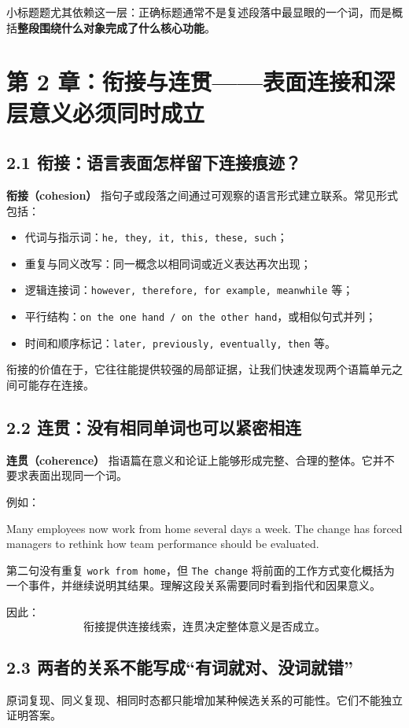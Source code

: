 \documentclass[11pt,a4paper]{ctexart}
\newcommand{\kw}[1]{\textbf{#1}}
\newcommand{\term}[2]{\textbf{#1（#2）}}
\begin{document}
小标题题尤其依赖这一层：正确标题通常不是复述段落中最显眼的一个词，而是概括\kw{整段围绕什么对象完成了什么核心功能}。

\section{第 2 章：衔接与连贯——表面连接和深层意义必须同时成立}

\subsection{2.1 衔接：语言表面怎样留下连接痕迹？}
\term{衔接}{cohesion} 指句子或段落之间通过可观察的语言形式建立联系。常见形式包括：
\begin{itemize}
  \item 代词与指示词：\texttt{he, they, it, this, these, such}；
  \item 重复与同义改写：同一概念以相同词或近义表达再次出现；
  \item 逻辑连接词：\texttt{however, therefore, for example, meanwhile} 等；
  \item 平行结构：\texttt{on the one hand / on the other hand}，或相似句式并列；
  \item 时间和顺序标记：\texttt{later, previously, eventually, then} 等。
\end{itemize}

衔接的价值在于，它往往能提供较强的局部证据，让我们快速发现两个语篇单元之间可能存在连接。

\subsection{2.2 连贯：没有相同单词也可以紧密相连}
\term{连贯}{coherence} 指语篇在意义和论证上能够形成完整、合理的整体。它并不要求表面出现同一个词。

例如：
\begin{eng}[例 2：没有原词复现也可以高度连贯]
Many employees now work from home several days a week. The change has forced managers to rethink how team performance should be evaluated.
\end{eng}
第二句没有重复 \texttt{work from home}，但 \texttt{The change} 将前面的工作方式变化概括为一个事件，并继续说明其结果。理解这段关系需要同时看到指代和因果意义。

因此：
\[
\boxed{\text{衔接提供连接线索，连贯决定整体意义是否成立。}}
\]

\subsection{2.3 两者的关系不能写成“有词就对、没词就错”}
原词复现、同义复现、相同时态都只能增加某种候选关系的可能性。它们不能独立证明答案。
\end{document}
